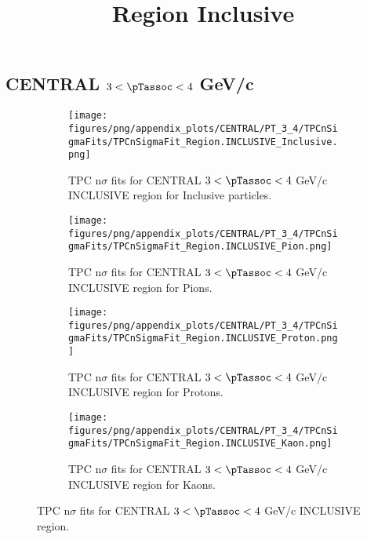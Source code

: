     
            \subsection*{CENTRAL $3 < \pTassoc < 4$ GeV/c}
            \begin{figure}[H]
                \title{Region Inclusive}
                \begin{subfigure}[b]{0.5\textwidth}
                    \centering
                    \texttt{[image: figures/png/appendix\_plots/CENTRAL/PT\_3\_4/TPCnSigmaFits/TPCnSigmaFit\_Region.INCLUSIVE\_Inclusive.png]}
                    \caption{TPC n$\sigma$ fits for CENTRAL $3 < \pTassoc < 4$ GeV/c INCLUSIVE region for Inclusive particles.}
                    \label{fig:appendix_CENTRAL_$3 < \pTassoc < 4$ GeV/c_INCLUSIVE_Inclusive}
                \end{subfigure}
                \begin{subfigure}[b]{0.5\textwidth}
                    \centering
                    \texttt{[image: figures/png/appendix\_plots/CENTRAL/PT\_3\_4/TPCnSigmaFits/TPCnSigmaFit\_Region.INCLUSIVE\_Pion.png]}
                    \caption{TPC n$\sigma$ fits for CENTRAL $3 < \pTassoc < 4$ GeV/c INCLUSIVE region for Pions.}
                    \label{fig:appendix_CENTRAL_$3 < \pTassoc < 4$ GeV/c_INCLUSIVE_Pion}
                \end{subfigure}
                \begin{subfigure}[b]{0.5\textwidth}
                    \centering
                    \texttt{[image: figures/png/appendix\_plots/CENTRAL/PT\_3\_4/TPCnSigmaFits/TPCnSigmaFit\_Region.INCLUSIVE\_Proton.png]}
                    \caption{TPC n$\sigma$ fits for CENTRAL $3 < \pTassoc < 4$ GeV/c INCLUSIVE region for Protons.}
                    \label{fig:appendix_CENTRAL_$3 < \pTassoc < 4$ GeV/c_INCLUSIVE_Proton}
                \end{subfigure}
                \begin{subfigure}[b]{0.5\textwidth}
                    \centering
                    \texttt{[image: figures/png/appendix\_plots/CENTRAL/PT\_3\_4/TPCnSigmaFits/TPCnSigmaFit\_Region.INCLUSIVE\_Kaon.png]}
                    \caption{TPC n$\sigma$ fits for CENTRAL $3 < \pTassoc < 4$ GeV/c INCLUSIVE region for Kaons.}
                    \label{fig:appendix_CENTRAL_$3 < \pTassoc < 4$ GeV/c_INCLUSIVE_Kaon}
                \end{subfigure}
                \caption{TPC n$\sigma$ fits for CENTRAL $3 < \pTassoc < 4$ GeV/c INCLUSIVE region.}
                \label{fig:appendix_CENTRAL_$3 < \pTassoc < 4$ GeV/c_INCLUSIVE}
            \end{figure}
